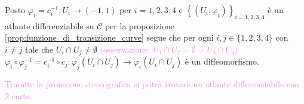 \begin{esempio}
\begin{center}
        \end{center}
        Posto $\varphi_i = c_i^{-1}: U_i \to (-1,1)$ per $i=1,2,3,4$ e $\displaystyle \left\{\left(U_i, \varphi_i\right)\right\}_{i=1,2,3,4}$ è un
        atlante differenziabile su $\mathcal{C}$ per la proposizione \ref{prop:funzione_di_transizione_curve} segue che per ogni 
        $i,j \in \{1,2,3,4\}$ con $i \neq j$ tale che $U_i \cap U_j \neq \emptyset$ \textcolor{violet}{(osservazione: $U_1 \cap U_2 = \emptyset = U_3 \cap U_4 $)}
        $\varphi_i \circ \varphi_j^{-1}= c_i^{-1} \circ c_j: \varphi_j(U_i \cap U_j) \to \varphi_i(U_i \cap U_j)$ è un diffeomorfismo.

        \textcolor{violet}{Tramite la proiezione stereografica si potrà trovare un atlante differenziabile con $2$ carte.}
        \end{esempio}
